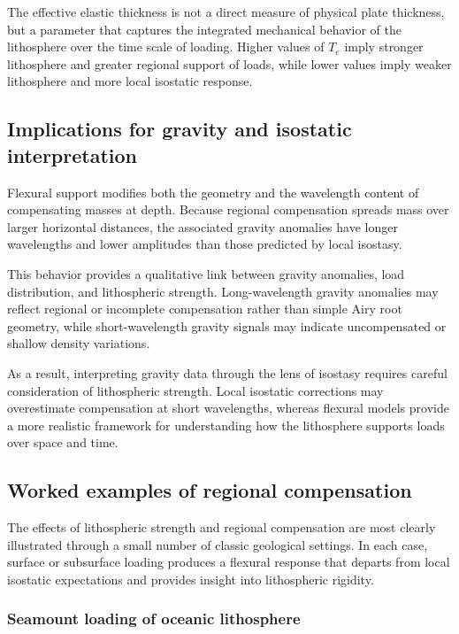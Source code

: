 The effective elastic thickness is not a direct measure of physical plate thickness, but a parameter that captures the integrated mechanical behavior of the lithosphere over the time scale of loading. Higher values of \( T_e \) imply stronger lithosphere and greater regional support of loads, while lower values imply weaker lithosphere and more local isostatic response.

\subsection{Implications for gravity and isostatic interpretation}

Flexural support modifies both the geometry and the wavelength content of compensating masses at depth. Because regional compensation spreads mass over larger horizontal distances, the associated gravity anomalies have longer wavelengths and lower amplitudes than those predicted by local isostasy.

This behavior provides a qualitative link between gravity anomalies, load distribution, and lithospheric strength. Long-wavelength gravity anomalies may reflect regional or incomplete compensation rather than simple Airy root geometry, while short-wavelength gravity signals may indicate uncompensated or shallow density variations.

As a result, interpreting gravity data through the lens of isostasy requires careful consideration of lithospheric strength. Local isostatic corrections may overestimate compensation at short wavelengths, whereas flexural models provide a more realistic framework for understanding how the lithosphere supports loads over space and time.

\subsection{Worked examples of regional compensation}

The effects of lithospheric strength and regional compensation are most clearly illustrated through a small number of classic geological settings. In each case, surface or subsurface loading produces a flexural response that departs from local isostatic expectations and provides insight into lithospheric rigidity.

\subsubsection{Seamount loading of oceanic lithosphere}

